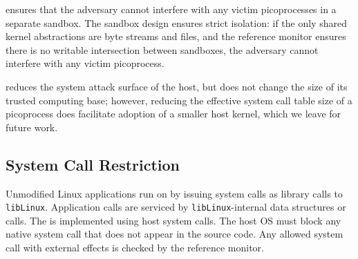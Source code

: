 \sysname{} ensures that %
the adversary cannot interfere with any victim picoprocesses
in a separate sandbox.  
The \sysname{} sandbox design ensures strict isolation: 
if the only shared kernel abstractions are byte streams and files, 
and the reference monitor ensures
there is no writable intersection between sandboxes,
the adversary cannot interfere with any victim picoprocess.



\sysname{} reduces the system attack surface of the host, but does not change the size of its
trusted computing base; however, reducing the effective system call table
size of a picoprocess does facilitate adoption of a smaller host kernel,
which we leave for future work.

\subsection{System Call Restriction}
\label{sec:graphene:security:syscalls}


Unmodified Linux applications run on \sysname{} by issuing 
system calls as library calls to {\tt libLinux}.
Application calls are serviced by {\tt libLinux}-internal data structures
or \pal{} calls.
The \pal{} is implemented using \nativecalls{} host system calls.
The host OS must block any 
native system call that 
does not appear in the \pal{} source code.
Any allowed system call with external effects is checked by 
the reference monitor.
 





